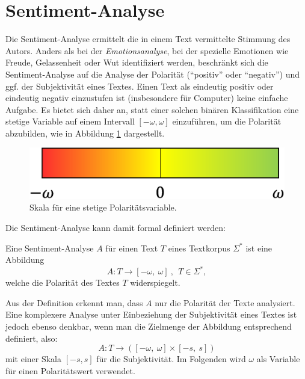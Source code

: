 \documentclass[
	a4paper,
	12pt,
	bibliography=totocnumbered,
	twoside,
]{scrreprt}
\begin{document}
\section{Sentiment-Analyse}
\label{sec:sentiment}

Die Sentiment-Analyse ermittelt die in einem Text vermittelte Stimmung des Autors. Anders als bei der \textit{Emotionsanalyse}, bei der spezielle Emotionen wie Freude, Gelassenheit oder Wut identifiziert werden, beschränkt sich die Sentiment-Analyse auf die Analyse der Polarität ("`positiv"' oder "`negativ"') und ggf. der Subjektivität eines Textes.
Einen Text als eindeutig positiv oder eindeutig negativ einzustufen ist (insbesondere für Computer) keine einfache Aufgabe. Es bietet sich daher an, statt einer solchen binären Klassifikation eine stetige Variable auf einem Intervall $[-\omega, \omega]$ einzuführen, um die Polarität abzubilden, wie in Abbildung \ref{img:polarity-scale} dargestellt.

\begin{figure}[hbt!]
	\centering
	\includegraphics[width=.3\textwidth]{images/polarity_scale.eps}
	\caption[Skala für eine stetige Polaritätsvariable]{Skala für eine stetige Polaritätsvariable\footnotemark.}
	\label{img:polarity-scale}
\end{figure}

Die Sentiment-Analyse kann damit formal definiert werden:

\begin{Definition}
	\label{def:sentiment-analyse}
	Eine Sentiment-Analyse $A$ für einen Text $T$ eines Textkorpus $\Sigma^*$ ist eine Abbildung	\begin{equation*}
	    A: T \rightarrow [-\omega, \ \omega] \ , \ \ T \in \Sigma^*,
	\end{equation*}
	welche die Polarität des Textes $T$ widerspiegelt.
\end{Definition}

Aus der Definition erkennt man, dass $A$ nur die Polarität der Texte analysiert. Eine komplexere Analyse unter Einbeziehung der Subjektivität eines Textes ist jedoch ebenso denkbar, wenn man die Zielmenge der Abbildung entsprechend definiert, also:
\begin{equation}
    A: T \rightarrow ([-\omega, \ \omega] \times [-s, \ s])
\end{equation}
mit einer Skala $[-s, s]$ für die Subjektivität. Im Folgenden wird $\omega$ als Variable für einen Polaritätswert verwendet. \\
\end{document}
